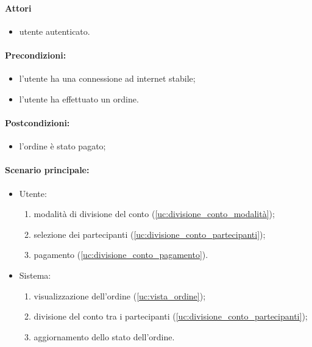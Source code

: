 \label{uc:divisione_conto}

\paragraph{Attori}
\begin{itemize}
	\item utente autenticato.
\end{itemize}

\paragraph{Precondizioni:}
\begin{itemize}
	\item l'utente ha una connessione ad internet stabile;
	\item l'utente ha effettuato un ordine.
\end{itemize}

\paragraph{Postcondizioni:}
\begin{itemize}
	\item l'ordine è stato pagato;
\end{itemize}

\paragraph{Scenario principale:}
\begin{itemize}
	\item Utente:
	      \begin{enumerate}
		      \item modalità di divisione del conto (\autoref{uc:divisione_conto_modalità});
		      \item selezione dei partecipanti (\autoref{uc:divisione_conto_partecipanti});
		      \item pagamento (\autoref{uc:divisione_conto_pagamento}).
	      \end{enumerate}
	\item Sistema:
	      \begin{enumerate}
		      \item visualizzazione dell'ordine (\autoref{uc:vista_ordine});
		      \item divisione del conto tra i partecipanti
		            (\autoref{uc:divisione_conto_partecipanti});
		      \item aggiornamento dello stato dell'ordine.
	      \end{enumerate}
\end{itemize}

